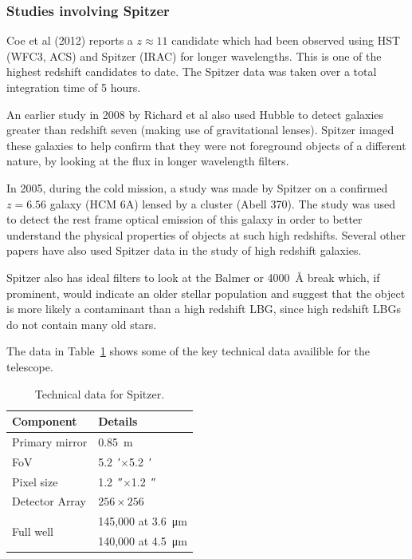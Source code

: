 	\subsubsection{Studies involving Spitzer} %
	\label{ssub:studies_involving_spitzer}
		Coe et al (2012)\cite{0004-637X-762-1-32} reports a $z\approx11$ candidate which had been observed using HST (WFC3, ACS) and Spitzer (IRAC) for longer wavelengths. This is one of the highest redshift candidates to date. The Spitzer data was taken over a total integration time of 5 hours.

		An earlier study in 2008 by Richard et al also used Hubble to detect galaxies greater than redshift seven (making use of gravitational lenses). Spitzer imaged these galaxies to help confirm that they were not foreground objects of a different nature, by looking at the flux in longer wavelength filters\cite{0004-637X-685-2-705}.

		In 2005, during the cold mission, a study was made by Spitzer on a confirmed $z=6.56$ galaxy (HCM 6A) lensed by a cluster (Abell 370). The study was used to detect the rest frame optical emission of this galaxy in order to better understand the physical properties of objects at such high redshifts\cite{1538-4357-635-1-L5}. Several other papers have also used Spitzer data in the study of high redshift galaxies.

		Spitzer also has ideal filters to look at the Balmer or \SI{4000}{\angstrom} break which, if prominent, would indicate an older stellar population and suggest that the object is more likely a contaminant than a high redshift LBG, since high redshift LBGs do not contain many old stars.

		The data in Table~\ref{tab:Spitzer_technical} shows some of the key technical data availible for the telescope.
		\begin{table}[htbp]
			\begin{center}
				\begin{tabular}{l|l}
					Component   &   Details \\
					\hline\hline
					Primary mirror & \SI{0.85}{\metre} \\
					FoV & \SI{5.2}{\arcminute}$\times$\SI{5.2}{\arcminute} \\
					Pixel size & \SI{1.2}{\arcsecond}$\times$\SI{1.2}{\arcsecond} \\
					Detector Array & $256\times256$\,\si{\pixel} \\
					\multirow{2}{*}{Full well} & 145,000 at \SI{3.6}{\micro\metre} \\
							& 140,000 at \SI{4.5}{\micro\metre} \\
				\end{tabular}
			\end{center}
			\caption{Technical data for Spitzer\cite{Spitzer_Heritage_Archive_Documentation}.\label{tab:Spitzer_technical}}
		\end{table}
